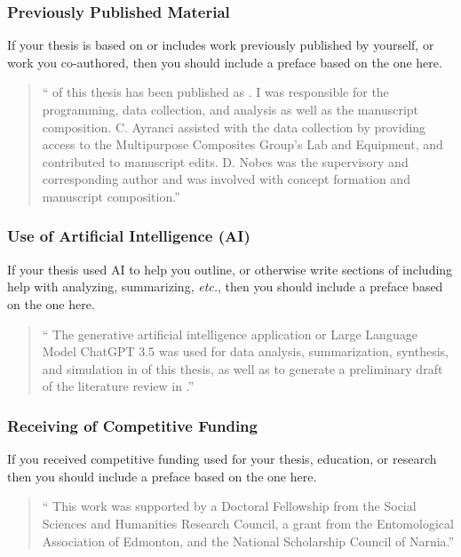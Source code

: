 			\subsubsection{Previously Published Material}\label{preface:PPW}
				If your thesis is based on or includes work previously published by yourself, or work you co-authored, then you should include a preface based on the one here.

				\begin{quote}
					\enquote{%
						 of this thesis has been published as . 
						I was responsible for the programming, data collection, and analysis as well as the manuscript composition. C. Ayranci assisted with the data collection by providing access to the Multipurpose Composites Group's Lab and Equipment, and contributed to manuscript edits. D. Nobes was the supervisory and corresponding author and was involved with concept formation and manuscript composition.}
				\end{quote}

			\subsubsection{Use of Artificial Intelligence (AI)}\label{preface:AI}
				If your thesis used AI to help you outline, or otherwise write sections of including help with analyzing, summarizing, \textit{etc.}, then you should include a preface based on the one here.

				\begin{quote}
					\enquote{%
						The generative artificial intelligence application or Large Language Model ChatGPT 3.5 was used for data analysis, summarization, synthesis, and simulation in  of this thesis, as well as to generate a preliminary draft of the literature review in .}
				\end{quote}

			\subsubsection{Receiving of Competitive Funding}\label{preface:CF}
				If you received competitive funding used for your thesis, education, or research then you should include a preface based on the one here.

				\begin{quote}
					\enquote{%
						This work was supported by a Doctoral Fellowship from the Social Sciences and Humanities Research Council, a grant from the Entomological Association of Edmonton, and the National Scholarship Council of Narnia.}
				\end{quote}
				
